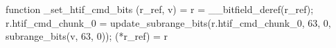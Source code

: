 function _set_htif_cmd_bits (r_ref, v) = {
    r = __bitfield_deref(r_ref);
    r.htif_cmd_chunk_0 = update_subrange_bits(r.htif_cmd_chunk_0, 63, 0, subrange_bits(v, 63, 0));
    (*r_ref) = r
}
